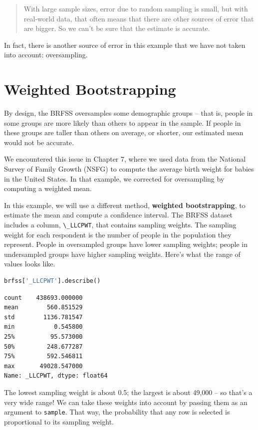 \begin{quote}
With large sample sizes, error due to random sampling is small, but with
real-world data, that often means that there are other sources of error
that are bigger. So we can't be sure that the estimate is accurate.
\end{quote}

In fact, there is another source of error in this example that we have
not taken into account: oversampling.

\hypertarget{weighted-bootstrapping}{%
\section{Weighted Bootstrapping}\label{weighted-bootstrapping}}

By design, the BRFSS oversamples some demographic groups -- that is,
people in some groups are more likely than others to appear in the
sample. If people in these groups are taller than others on average, or
shorter, our estimated mean would not be accurate.

We encountered this issue in Chapter 7, where we used data from the
National Survey of Family Growth (NSFG) to compute the average birth
weight for babies in the United States. In that example, we corrected
for oversampling by computing a weighted mean.

In this example, we will use a different method, \textbf{weighted
bootstrapping}, to estimate the mean and compute a confidence interval.
The BRFSS dataset includes a column, \passthrough{\lstinline!\_LLCPWT!},
that contains sampling weights. The sampling weight for each respondent
is the number of people in the population they represent. People in
oversampled groups have lower sampling weights; people in undersampled
groups have higher sampling weights. Here's what the range of values
looks like.

\begin{lstlisting}[language=Python,style=source]
brfss['_LLCPWT'].describe()
\end{lstlisting}

\begin{lstlisting}[style=output]
count    438693.000000
mean        560.851529
std        1136.781547
min           0.545800
25%          95.573000
50%         248.677287
75%         592.546811
max       49028.547000
Name: _LLCPWT, dtype: float64
\end{lstlisting}

The lowest sampling weight is about 0.5; the largest is about 49,000 --
so that's a very wide range! We can take these weights into account by
passing them as an argument to \passthrough{\lstinline!sample!}. That
way, the probability that any row is selected is proportional to its
sampling weight.

